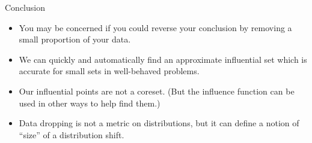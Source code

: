 




\begin{frame}{Conclusion}

\begin{itemize}
\item You may be concerned if you could reverse your conclusion by removing
a small proportion of your data.

\pause \item We can quickly and automatically find an approximate influential
set which is accurate for small sets in well-behaved problems.

\pause \item Our influential points are not a coreset.  (But the influence
function can be used in other ways to help find them.)

\pause \item Data dropping is not a metric on distributions, but it
can define a notion of ``size'' of a distribution shift.

\end{itemize}

\end{frame}





